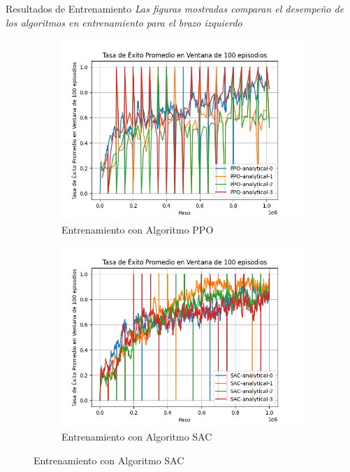 \documentclass[spanish,10pt]{beamer}
\begin{document}
	\begin{frame}{Resultados de Entrenamiento}
		\textit{Las figuras mostradas comparan el desempeño de los algoritmos en entrenamiento para el brazo izquierdo}\\[1em]
		
		\begin{figure}[h!]
			\centering
			
			\begin{subfigure}[b]{0.48\textwidth}
				\centering
				\includegraphics[width=\textwidth]{images/graphs/PPO/Left/success_rate}
				\caption{Entrenamiento con Algoritmo PPO}
				\label{fig:train-ppo-succ-left}
			\end{subfigure}
			\hfill
			\begin{subfigure}[b]{0.48\textwidth}
				\centering
				\includegraphics[width=\textwidth]{images/graphs/SAC/Left/success_rate}
				\caption{Entrenamiento con Algoritmo SAC}
				\label{fig:train-sac-succ-left}
			\end{subfigure}
		\end{figure}
	\end{frame}
	
\end{document}
